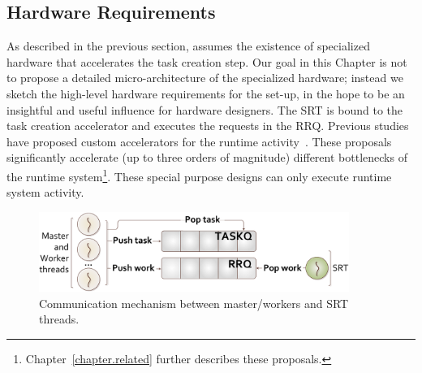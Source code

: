 \subsection{Hardware Requirements}
\label{sec:hw_req}

As described in the previous section, {\proposal} assumes the existence of specialized hardware that accelerates the task creation step. 
Our goal in this Chapter is not to propose a detailed micro-architecture of the specialized hardware; instead we sketch the high-level hardware requirements for the {\proposal} set-up, in the hope to be an insightful and useful influence for hardware designers.
The SRT is bound to the task creation accelerator and executes the requests in the RRQ. 
Previous studies have proposed custom accelerators for the runtime activity~\cite{TaskSS, Xubin, Nexus, Swarm, TMU, Carbon}. 
These proposals significantly accelerate (up to three orders of magnitude) different bottlenecks of the runtime system\footnote{Chapter~\ref{chapter.related} further describes these proposals.}. 
These special purpose designs can only execute runtime system activity.


\begin{figure}[t!]%
	\centering
	
	\includegraphics[width=0.9\textwidth]{figures/communication2.pdf}
	\caption{Communication mechanism between master/workers and SRT threads.}
	\label{fig:communication}
\end{figure}
	
